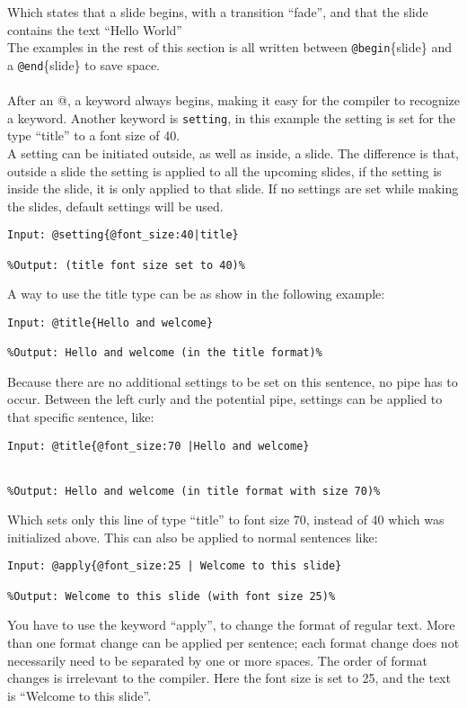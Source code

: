 Which states that a slide begins, with a transition ``fade'', and that the slide contains the text ``Hello World'' \\
The examples in the rest of this section is all written between \texttt{@begin}\{slide\} and a \texttt{@end}\{slide\} to save space.
\\ \\
After an @, a keyword always begins, making it easy for the compiler to recognize a keyword.
Another keyword is \texttt{setting}, in this example the setting is set for the type ``title'' to a font size of 40. \\
A setting can be initiated outside, as well as inside, a slide. The difference is that, outside a slide the setting is applied to all the upcoming slides, if the setting is inside the slide, it is only applied to that slide. If no settings are set while making the slides, default settings will be used.

\begin{lstlisting}[frame=single]
Input: @setting{@font_size:40|title}

%Output: (title font size set to 40)%
\end{lstlisting}

A way to use the title type can be as show in the following example: \\

\begin{lstlisting}[frame=single]
Input: @title{Hello and welcome}

%Output: Hello and welcome (in the title format)%
\end{lstlisting}

Because there are no additional settings to be set on this sentence, no pipe has to occur. Between the left curly and the potential pipe, settings can be applied to that specific sentence, like: \\

\begin{lstlisting}[frame=single]
Input: @title{@font_size:70 |Hello and welcome}


%Output: Hello and welcome (in title format with size 70)%
\end{lstlisting}
Which sets only this line of type ``title'' to font size 70, instead of 40 which was initialized above.
This can also be applied to normal sentences like:\\

\begin{lstlisting}[frame=single]
Input: @apply{@font_size:25 | Welcome to this slide}

%Output: Welcome to this slide (with font size 25)%
\end{lstlisting}
You have to use the keyword ``apply'', to change the format of regular text. More than one format change can be applied per sentence; each format change does not necessarily need to be separated by one or more spaces. The order of format changes is irrelevant to the compiler. Here the font size is set to 25, and the text is ``Welcome to this slide''.

